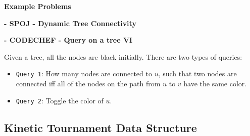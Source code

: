 \textbf{Example Problems}

\begin{problem}
  \textbf{- SPOJ - Dynamic Tree Connectivity} \cite{SPOJ_DYNACON1}
\end{problem}

\begin{problem}
  \textbf{- CODECHEF - Query on a tree VI} \cite{QTREE6}

  Given a tree, all the nodes are black initially. There are two types of queries:
\end{problem}
\begin{itemize}
  \item {\lstinline{Query 1}: How many nodes are connected to $u$, such that two nodes are connected iff all of the nodes on the path from $u$ to $v$ have the same color.}
  \item {\lstinline{Query 2}: Toggle the color of $u$.}
\end{itemize}

\subsection{Kinetic Tournament Data Structure}

\hrulefill \vspace{-\baselineskip}
\begin{multicols}{2}
\inputminted[autogobble,fontsize=\tiny]{C++}{Data Structures/kinetic.cpp}
\end{multicols}
\vspace{-\baselineskip}
\noindent \hrulefill